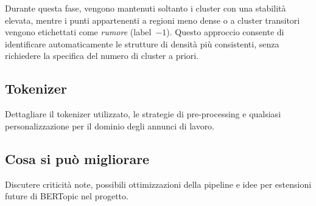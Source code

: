 Durante questa fase, vengono mantenuti soltanto i cluster con una stabilità elevata, mentre i punti appartenenti a regioni meno dense o a cluster transitori vengono etichettati come \textit{rumore} (label~$-1$). 
Questo approccio consente di identificare automaticamente le strutture di densità più consistenti, senza richiedere la specifica del numero di cluster a priori.

\subsection{Tokenizer}
Dettagliare il tokenizer utilizzato, le strategie di pre-processing e qualsiasi personalizzazione per il dominio degli annunci di lavoro.

\subsection{Cosa si può migliorare}
Discutere criticità note, possibili ottimizzazioni della pipeline e idee per estensioni future di BERTopic nel progetto.
